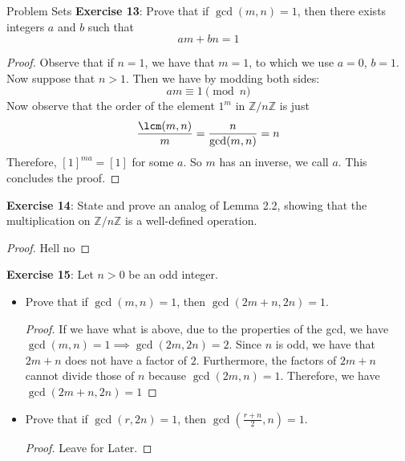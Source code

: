 \documentclass{report}
\begin{document}
\begin{exercises}{Problem Sets}
    \textbf{Exercise 13}: Prove that if $\gcd(m, n) = 1$, then there exists integers $a$ and $b$ such that 
        \begin{equation*}
            am + bn = 1
        \end{equation*}
        \begin{proof}
            Observe that if $n = 1$, we have that $m = 1$, to which we use $a = 0$, $b = 1$. Now suppose that $n > 1$. Then we have by modding both sides:
                \begin{equation*}
                    am \equiv 1 \pmod{n}
                \end{equation*}
            Now observe that the order of the element $1^{m}$ in $\mathbb{Z}/n\mathbb{Z}$ is just 
                \begin{equation*}
                    \dfrac{\lcm(m, n)}{m} = \dfrac{n}{\gcd(m, n)} = n
                \end{equation*}
            Therefore, $[1]^{ma} = [1]$ for some $a$. So $m$ has an inverse, we call $a$. This concludes the proof.
        \end{proof}

    \textbf{Exercise 14}: State and prove an analog of Lemma 2.2, showing that the multiplication on $\mathbb{Z} / n\mathbb{Z}$ is a well-defined operation.
        \begin{proof}
            Hell no
        \end{proof}

    \textbf{Exercise 15}: Let $n > 0$ be an odd integer.
        \begin{itemize}
            \item Prove that if $\gcd(m, n) = 1$, then $\gcd(2m + n, 2n) = 1$.
                \begin{proof}
                    If we have what is above, due to the properties of the gcd, we have $\gcd(m, n) = 1 \implies \gcd(2m, 2n) = 2$. Since $n$ is odd, we have that $2m + n$ does not have a factor of $2$. Furthermore, the factors of $2m + n$ cannot divide those of $n$ because $\gcd(2m, n) = 1$. Therefore, we have $\gcd(2m + n, 2n) = 1$
                \end{proof}

            \item Prove that if $\gcd(r, 2n) = 1$, then $\gcd(\frac{r + n}{2}, n) = 1$.
                \begin{proof}
                    Leave for Later.
                \end{proof}


\end{itemize}
\end{exercises}
\end{document}
